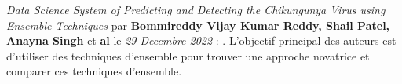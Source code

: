  \textit{Data Science System of Predicting and Detecting the Chikungunya Virus using Ensemble Techniques} par \textbf{Bommireddy Vijay Kumar Reddy, Shail Patel, Anayna Singh } et \textbf{al} le \textit{29 Decembre 2022} : . L'objectif principal des auteurs est d'utiliser des techniques d'ensemble pour trouver une approche novatrice et comparer ces techniques d'ensemble.
